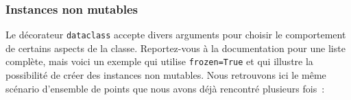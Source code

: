     \hypertarget{instances-non-mutables}{%
\subsubsection{Instances non mutables}\label{instances-non-mutables}}

    Le décorateur \texttt{dataclass} accepte divers arguments pour choisir
le comportement de certains aspects de la classe. Reportez-vous à la
documentation pour une liste complète, mais voici un exemple qui utilise
\texttt{frozen=True} et qui illustre la possibilité de créer des
instances non mutables. Nous retrouvons ici le même scénario d'ensemble
de points que nous avons déjà rencontré plusieurs fois~:

    \begin{Shaded}
\begin{Highlighting}[frame=lines,framerule=0.6mm,rulecolor=\color{asisframecolor}]
\OperatorTok{>>>} \OperatorTok{;} 
 \NormalTok{, }\NormalTok{:}\NormalTok{:}\NormalTok{)}
\NormalTok{[Clang }\NormalTok{)]}
\end{Highlighting}
\end{Shaded}

